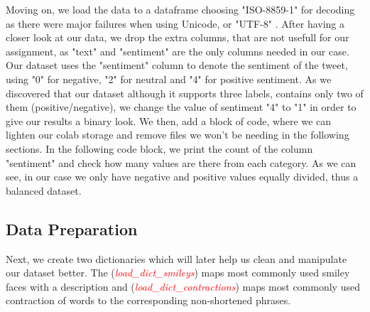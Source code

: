 \documentclass[10pt]{article}
\begin{document}
Moving on, we load the data to a dataframe choosing "ISO-8859-1" for decoding as there were major failures when using Unicode, or "UTF-8" . After having a closer look at our data, we drop the extra columns, that are not usefull for our assignment, as "text" and "sentiment" are the only columns needed in our case. Our dataset uses the "sentiment" column to denote the sentiment of the tweet, using "0" for negative, "2" for neutral and "4" for positive sentiment. As we discovered that our dataset although it supports three labels, contains only two of them (positive/negative), we change the value of sentiment "4" to "1" in order to give our results a binary look. We then, add a block of code, where we can lighten our colab storage and remove files we won't be needing in the following sections. In the following code block, we print the count of the column "sentiment" and check how many values are there from each category. As we can see, in our case we only have negative and positive values equally divided, thus a balanced dataset. 

\subsection*{Data Preparation}

Next, we create two dictionaries which will later help us clean and manipulate our dataset better. The (\textcolor{red}{\textit{load\_dict\_smileys}}) maps most commonly used smiley faces with a description and (\textcolor{red}{\textit{load\_dict\_contractions}}) maps most commonly used contraction of words to the corresponding non-shortened phrases.
\end{document}
